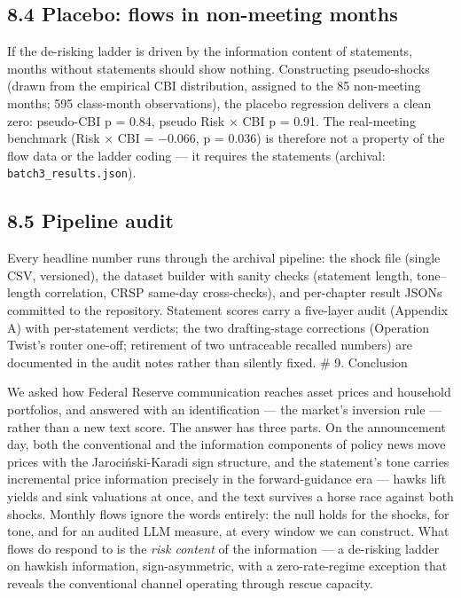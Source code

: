 \subsection{8.4 Placebo: flows in non-meeting months}\label{placebo-flows-in-non-meeting-months}

If the de-risking ladder is driven by the information content of statements, months without statements should show nothing. Constructing pseudo-shocks (drawn from the empirical CBI distribution, assigned to the 85 non-meeting months; 595 class-month observations), the placebo regression delivers a clean zero: pseudo-CBI p = 0.84, pseudo Risk × CBI p = 0.91. The real-meeting benchmark (Risk × CBI = −0.066, p = 0.036) is therefore not a property of the flow data or the ladder coding --- it requires the statements (archival: \texttt{batch3\_results.json}).

\subsection{8.5 Pipeline audit}\label{pipeline-audit}

Every headline number runs through the archival pipeline: the shock file (single CSV, versioned), the dataset builder with sanity checks (statement length, tone--length correlation, CRSP same-day cross-checks), and per-chapter result JSONs committed to the repository. Statement scores carry a five-layer audit (Appendix A) with per-statement verdicts; the two drafting-stage corrections (Operation Twist's router one-off; retirement of two untraceable recalled numbers) are documented in the audit notes rather than silently fixed. \# 9. Conclusion

We asked how Federal Reserve communication reaches asset prices and household portfolios, and answered with an identification --- the market's inversion rule --- rather than a new text score. The answer has three parts. On the announcement day, both the conventional and the information components of policy news move prices with the Jarociński-Karadi sign structure, and the statement's tone carries incremental price information precisely in the forward-guidance era --- hawks lift yields and sink valuations at once, and the text survives a horse race against both shocks. Monthly flows ignore the words entirely: the null holds for the shocks, for tone, and for an audited LLM measure, at every window we can construct. What flows do respond to is the \emph{risk content} of the information --- a de-risking ladder on hawkish information, sign-asymmetric, with a zero-rate-regime exception that reveals the conventional channel operating through rescue capacity.

